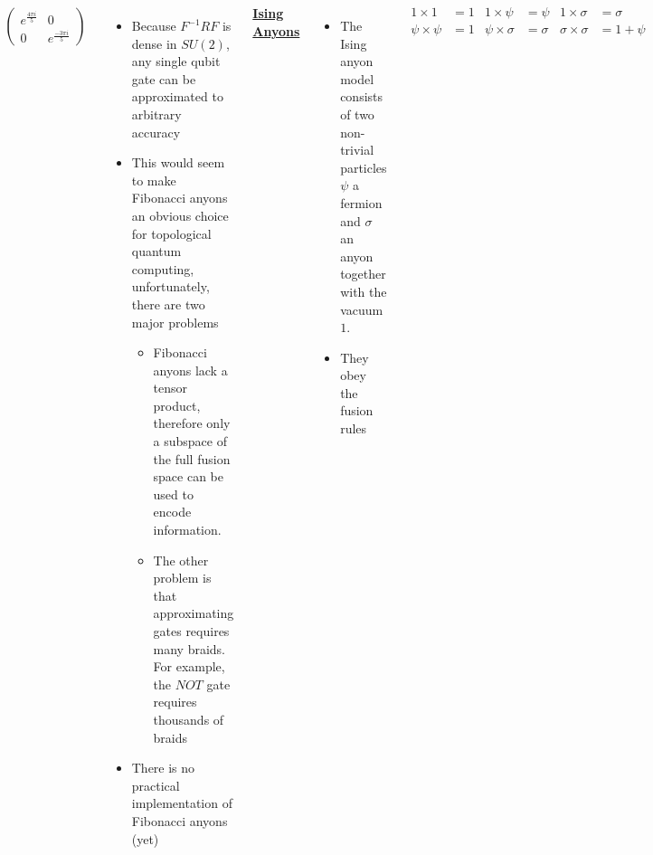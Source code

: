 \documentclass[20pt,,margin=1in,innermargin=-4.5in,blockverticalspace=-0.25in]{tikzposter}
\begin{document}
\begin{columns}
{\begin{align*}
\begin{pmatrix}
                e^{\frac{4\pi i}{5}}&0\\0&e^{\frac{-3\pi i}{5}}
            \end{pmatrix}
        \end{align*}
        \begin{itemize}
            \item Because $F^{-1}RF$ is dense in $SU(2)$, any single qubit gate can be approximated to arbitrary accuracy
            \item This would seem to make Fibonacci anyons an obvious choice for topological quantum computing, unfortunately, there are two major problems
            \begin{itemize}
                \item Fibonacci anyons lack a tensor product, therefore only a subspace of the full fusion space can be used to encode information.
                \item The other problem is that approximating gates requires many braids. For example, the $NOT$ gate requires thousands of braids
            \end{itemize}
            \item There is no practical implementation of Fibonacci anyons (yet)
        \end{itemize}
        \begin{center}
            \textbf{\underline{Ising Anyons} \cite{cite:1}}
        \end{center}
        \begin{itemize}
            \item The Ising anyon model consists of two non-trivial particles $\psi$ a fermion and $\sigma$ an anyon together with the vacuum $1$.
            \item They obey the fusion rules
        \end{itemize}
        \begin{align*}
            1\times1&=1 & 1\times\psi&=\psi & 1\times\sigma&=\sigma\\
            \psi\times\psi&=1 & \psi\times\sigma&=\sigma & \sigma\times\sigma&=1+\psi
        \end{align*}
        \begin{itemize}
            \item These rules give raise to the following fusion and braiding matrices:
        \end{itemize}
        \begin{align*}
            F&=\frac{1}{\sqrt{2}}
            \begin{pmatrix}

\end{pmatrix}
\end{align*}}
\end{columns}
\end{document}
